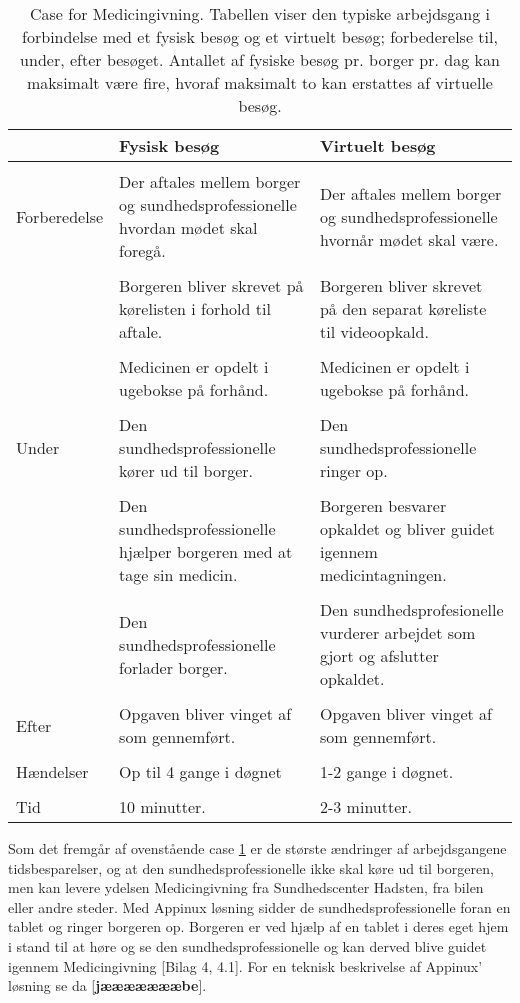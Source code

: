 \begin{table}[H]
	\caption{Case for Medicingivning. Tabellen viser den typiske arbejdsgang i forbindelse med et fysisk besøg og et virtuelt besøg; forbederelse til, under, efter besøget. Antallet af fysiske besøg pr. borger pr. dag kan maksimalt være fire, hvoraf maksimalt to kan erstattes af virtuelle besøg.}
	\centering
	\label{tab:Case}
	\begin{tabularx}{\textwidth}{|l|X|X|}
		
		\hline
		  & \textbf{Fysisk besøg} & \textbf{Virtuelt besøg}\\ \hline
		& & \\Forberedelse & Der aftales mellem borger og sundhedsprofessionelle hvordan mødet skal foregå. & Der aftales mellem borger og sundhedsprofessionelle hvornår mødet skal være.\\ & &\\
		 & Borgeren bliver skrevet på kørelisten i forhold til aftale. & Borgeren bliver skrevet på den separat køreliste til videoopkald.\\  & &\\
		 & Medicinen er opdelt i ugebokse på forhånd. & Medicinen er opdelt i ugebokse på forhånd.\\[4ex] \hline & & \\
		 Under & Den sundhedsprofessionelle kører ud til borger. & Den sundhedsprofessionelle ringer op.\\  & &\\
		  & Den sundhedsprofessionelle hjælper borgeren med at tage sin medicin. & Borgeren besvarer opkaldet og bliver guidet igennem medicintagningen.\\ & &\\
		  & Den sundhedsprofessionelle forlader borger. & Den sundhedsprofesionelle vurderer arbejdet som gjort og afslutter opkaldet.\\[4ex] \hline & & \\Efter & Opgaven bliver vinget af som gennemført. & Opgaven bliver vinget af som gennemført.\\[4ex] \hline
		  & & \\Hændelser & Op til 4 gange i døgnet & 1-2 gange i døgnet.\\ [4ex] \hline
		  & & \\Tid & 10 minutter. & 2-3 minutter.\\[4ex] \hline
	\end{tabularx}
\end{table}

Som det fremgår af ovenstående case \ref{tab:Case} er de største ændringer af arbejdsgangene tidsbesparelser, og at den sundhedsprofessionelle ikke skal køre ud til borgeren, men kan levere ydelsen Medicingivning fra Sundhedscenter Hadsten, fra bilen eller andre steder. Med Appinux løsning sidder de sundhedsprofessionelle foran en tablet og ringer borgeren op. Borgeren er ved hjælp af en tablet i deres eget hjem i stand til at høre og se den sundhedsprofessionelle og kan derved blive guidet igennem Medicingivning [Bilag 4, 4.1]. For en teknisk beskrivelse af Appinux' løsning se da [\textbf{jæææææææbe}].


